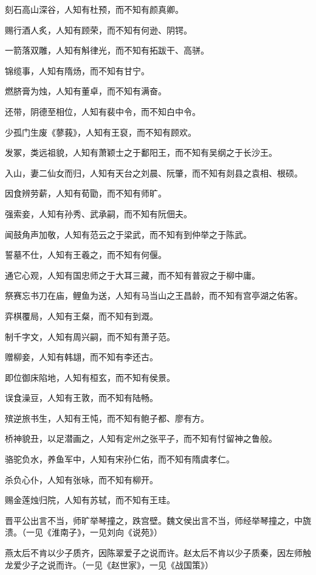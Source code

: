 \documentclass[a4paper,12pt,UTF8,twoside]{ctexbook}
\begin{document}
    刻石高山深谷，人知有杜预，而不知有颜真卿。
    
    赐行酒人炙，人知有顾荣，而不知有何逊、阴锷。
    
    一箭落双雕，人知有斛律光，而不知有拓跋干、高骈。
    
    锦缆事，人知有隋炀，而不知有甘宁。
    
    燃脐膏为烛，人知有董卓，而不知有满奋。
    
    还带，阴德至相位，人知有裴中令，而不知白中令。
    
    少孤门生废《蓼莪》，人知有王裒，而不知有顾欢。
    
    发冢，类远祖貌，人知有萧颖士之于鄱阳王，而不知有吴纲之于长沙王。
    
    入山，妻二仙女而归，人知有天台之刘晨、阮肇，而不知有剡县之袁相、根硕。
    
    因食辨劳薪，人知有荀勖，而不知有师旷。
    
    强索妾，人知有孙秀、武承嗣，而不知有阮佃夫。
    
    闻鼓角声加敬，人知有范云之于梁武，而不知有到仲举之于陈武。
    
    誓墓不仕，人知有王羲之，而不知有何偃。
    
    通它心观，人知有国忠师之于大耳三藏，而不知有普寂之于柳中庸。
    
    祭赛忘书刀在庙，鲤鱼为送，人知有马当山之王昌龄，而不知有宫亭湖之佑客。
    
    弈棋覆局，人知有王粲，而不知有到溉。
    
    制千字文，人知有周兴嗣，而不知有萧子范。
    
    赠柳妾，人知有韩翃，而不知有李还古。
    
    即位御床陷地，人知有桓玄，而不知有侯景。
    
    误食澡豆，人知有王敦，而不知有陆畅。
    
    殡逆旅书生，人知有王忳，而不知有鲍子都、廖有方。
    
    桥神貌丑，以足潜画之，人知有定州之张平子，而不知有忖留神之鲁般。
    
    骆驼负水，养鱼军中，人知有宋孙仁佑，而不知有隋虞孝仁。
    
    杀负心仆，人知有张咏，而不知有柳开。
    
    赐金莲烛归院，人知有苏轼，而不知有王珪。
    
    晋平公出言不当，师旷举琴撞之，跌宫壁。魏文侯出言不当，师经举琴撞之，中旒溃。（一见《淮南子》，一见刘向《说苑》）
    
    燕太后不肯以少子质齐，因陈翠爱子之说而许。赵太后不肯以少子质秦，因左师触龙爱少子之说而许。（一见《赵世家》，一见《战国策》）
    
\end{document}
